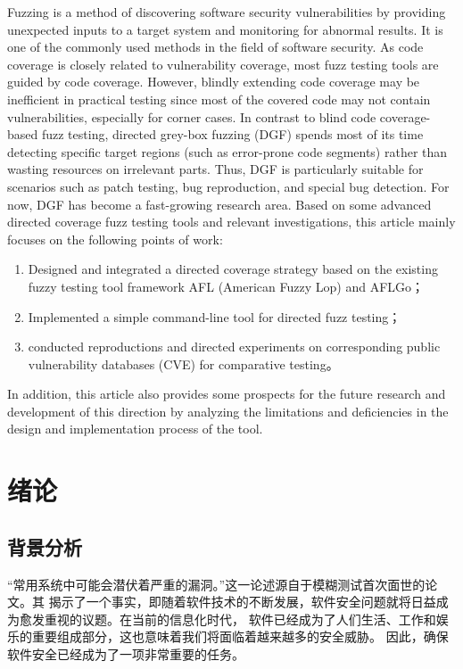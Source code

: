 \documentclass[bachelor]{njupthesis}
\begin{document}
\begin{englishabstract}
Fuzzing is a method of discovering software security vulnerabilities by providing 
unexpected inputs to a target system and monitoring for abnormal results. It is one of the 
commonly used methods in the field of software security. As code coverage is closely related 
to vulnerability coverage, most fuzz testing tools are guided by code coverage. However, blindly 
extending code coverage may be inefficient in practical testing since most of the covered code 
may not contain vulnerabilities, especially for corner cases.  In contrast to blind code coverage-based 
fuzz testing, directed grey-box fuzzing (DGF) spends most of its time detecting specific target regions 
(such as error-prone code segments) rather than wasting resources on irrelevant parts. 
Thus, DGF is particularly suitable for scenarios such as patch testing, bug reproduction, and 
special bug detection. For now, DGF has become a fast-growing research area.  Based on some advanced 
directed coverage fuzz testing tools and relevant investigations, this article mainly focuses on the 
following points of work:
\begin{enumerate}[label=(\arabic*)]
	\item Designed and integrated a directed coverage strategy based on the existing fuzzy testing tool framework AFL (American Fuzzy Lop) and AFLGo；
	\item Implemented a simple command-line tool for directed fuzz testing；
	\item conducted reproductions and directed experiments on corresponding public vulnerability databases (CVE) for comparative testing。
\end{enumerate}
In addition, this article also provides some prospects for the future research and development of this direction by 
analyzing the limitations and deficiencies in the design and implementation process of the tool.


\end{englishabstract}

\thesistableofcontents

\thesischapterexordium

\chapter{绪论}
\section{背景分析}
“常用系统中可能会潜伏着严重的漏洞\cite{miller1990empirical}。”这一论述源自于模糊测试首次面世的论文。其
揭示了一个事实，即随着软件技术的不断发展，软件安全问题就将日益成为愈发重视的议题。在当前的信息化时代，
软件已经成为了人们生活、工作和娱乐的重要组成部分，这也意味着我们将面临着越来越多的安全威胁。
因此，确保软件安全已经成为了一项非常重要的任务。
\end{document}
